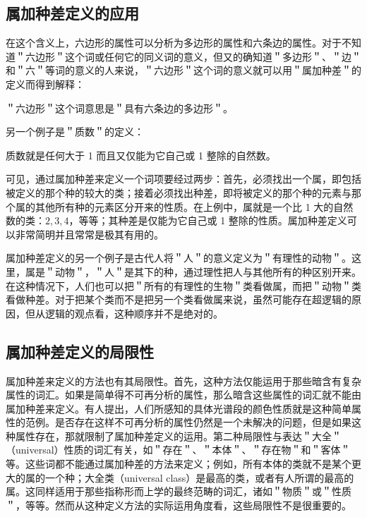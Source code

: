 \subsection{属加种差定义的应用}

在这个含义上，六边形的属性可以分析为多边形的属性和六条边的属性。对于不知道＂六边形＂这个词或任何它的同义词的意义，但又的确知道＂多边形＂、＂边＂和＂六＂等词的意义的人来说，＂六边形＂这个词的意义就可以用＂属加种差＂的定义而得到解释：

\begin{displayquote}
＂六边形＂这个词意思是＂具有六条边的多边形＂。
\end{displayquote}

另一个例子是＂质数＂的定义：

\begin{displayquote}
质数就是任何大于 1 而且又仅能为它自己或 1 整除的自然数。
\end{displayquote}

可见，通过属加种差来定义一个词项要经过两步：首先，必须找出一个属，即包括被定义的那个种的较大的类；接着必须找出种差，即将被定义的那个种的元素与那个属的其他所有种的元素区分开来的性质。在上例中，属就是一个比 1 大的自然数的类：$2,3,4$，等等；其种差是仅能为它自己或 1 整除的性质。属加种差定义可以非常简明并且常常是极其有用的。

属加种差定义的另一个例子是古代人将＂人＂的意义定义为＂有理性的动物＂。这里，属是＂动物＂，＂人＂是其下的种，通过理性把人与其他所有的种区别开来。在这种情况下，人们也可以把＂所有的有理性的生物＂类看做属，而把＂动物＂类看做种差。对于把某个类而不是把另一个类看做属来说，虽然可能存在超逻辑的原因，但从逻辑的观点看，这种顺序并不是绝对的。

\subsection{属加种差定义的局限性}

属加种差来定义的方法也有其局限性。首先，这种方法仅能运用于那些暗含有复杂属性的词汇。如果是简单得不可再分析的属性，那么暗含这些属性的词汇就不能由属加种差来定义。有人提出，人们所感知的具体光谱段的颜色性质就是这种简单属性的范例。是否存在这样不可再分析的属性仍然是一个未解决的问题，但是如果这种属性存在，那就限制了属加种差定义的运用。第二种局限性与表达＂大全＂（universal）性质的词汇有关，如＂存在＂、＂本体＂、＂存在物＂和＂客体＂等。这些词都不能通过属加种差的方法来定义；例如，所有本体的类就不是某个更大的属的一个种；大全类（universal class）是最高的类，或者有人所谓的最高的属。这同样适用于那些指称形而上学的最终范畴的词汇，诸如＂物质＂或＂性质＂，等等。然而从这种定义方法的实际运用角度看，这些局限性不是很重要的。

